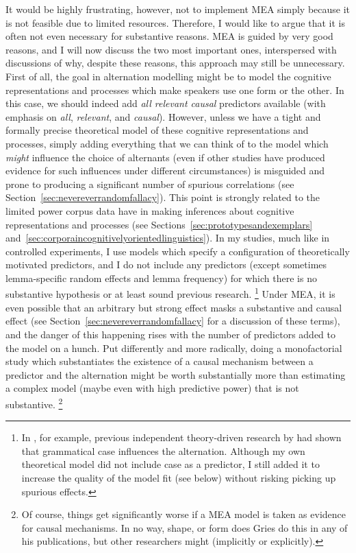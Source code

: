 It would be highly frustrating, however, not to implement MEA simply because it is not feasible due to limited resources.
Therefore, I would like to argue that it is often not even necessary for substantive reasons.
MEA is guided by very good reasons, and I will now discuss the two most important ones, interspersed with discussions of why, despite these reasons, this approach may still be unnecessary.
First of all, the goal in alternation modelling might be to model the cognitive representations and processes which make speakers use one form or the other.
In this case, we should indeed add \textit{all relevant causal} predictors available (with emphasis on \textit{all}, \textit{relevant}, and \textit{causal}).
However, unless we have a tight and formally precise theoretical model of these cognitive representations and processes, simply adding everything that we can think of to the model which \textit{might} influence the choice of alternants (even if other studies have produced evidence for such influences under different circumstances) is misguided and prone to producing a significant number of spurious correlations (see Section~\ref{sec:nevereverrandomfallacy}).
This point is strongly related to the limited power corpus data have in making inferences about cognitive representations and processes (see Sections~\ref{sec:prototypesandexemplars} and~\ref{sec:corporaincognitivelyorientedlinguistics}).
In my studies, much like in controlled experiments, I use models which specify a configuration of theoretically motivated predictors, and I do not include any predictors (except sometimes lemma-specific random effects and lemma frequency) for which there is no substantive hypothesis or at least sound previous research.%
\footnote{In \ROMeasure, for example, previous independent theory-driven research by \citet{Zimmer2015} had shown that grammatical case influences the alternation.
Although my own theoretical model did not include case as a predictor, I still added it to increase the quality of the model fit (see below) without risking picking up spurious effects.}
Under MEA, it is even possible that an arbitrary but strong effect masks a substantive and causal effect (see Section~\ref{sec:nevereverrandomfallacy} for a discussion of these terms), and the danger of this happening rises with the number of predictors added to the model on a hunch.
Put differently and more radically, doing a monofactorial study which substantiates the existence of a causal mechanism between a predictor and the alternation might be worth substantially more than estimating a complex model (maybe even with high predictive power) that is not substantive.%
\footnote{Of course, things get significantly worse if a MEA model is taken as evidence for causal mechanisms.
In no way, shape, or form does Gries do this in any of his publications, but other researchers might (implicitly or explicitly).}

